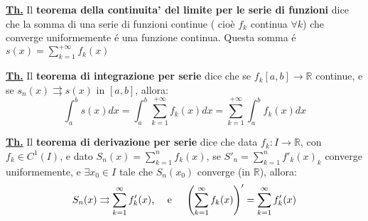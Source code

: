 \documentclass[a4paper,10pt]{article} %
\renewcommand{\b}[1]{%
    {\textbf{#1}}}
\newcommand{\lprop}[1]{%
    {\smallbreak\par\tiny\textbf{\underline{Prop.}} {#1} \smallbreak}}
\newcommand{\ltheorem}[1]{%
    {\smallbreak\par\tiny\textbf{\underline{Th.}} {#1} \smallbreak\par}}
\newcommand{\ldim}[1]{%
    {\smallbreak\par\tiny\emph{\textbf{Dimostrazione}} {#1} \par}}
\renewcommand{\ldim}[1]{{}}
\begin{document}
\begin{multicols}{6}

\ltheorem{
    Il \b{teorema della continuita' del limite per le serie di funzioni} dice che la somma di una serie di funzioni continue ( cio\`{e} $f_k$ continua $\forall k$) che converge uniformemente \'{e} una funzione continua. Questa somma \'{e} $ s(x) = \sum_{k=1}^{+\infty} f_k(x) $
}

\ltheorem{
    Il \b{teorema di integrazione per serie} dice che se
    $ f_k [a,b] \rightarrow \mathbb{R} $ continue, e se $ s_n(x) \rightrightarrows s(x) \text{ in } \left[a,b\right] $, allora:
    \[ \int_a^b s(x)dx = \int_a^b \sum_{k=1}^{+\infty} f_k(x) dx = \sum_{k=1}^{+\infty} \int_a^b f_k(x) dx \]
}

\ltheorem{
    Il \b{teorema di derivazione per serie} dice che data $f_k : I \rightarrow \mathbb{R}$, con
    $ f_k \in C^1(I)$, e dato $S_n(x) = \sum_{k=1}^n f_k(x)$, se $S'_n = \sum_{k=1}^n f'_k(x)_k$
    converge uniformemente, e $ \exists x_0 \in I $ tale che $ S_n(x_0) $ converge (in 
    $\mathbb{R}$), allora: 
    \[
    S_n(x) \rightrightarrows \sum_{k=1}^\infty f'_k(x)  \text{, \quad e \quad }
    \left( \sum_{k=1}^\infty f_k(x) \right)' = \sum_{k=1}^\infty f'_k(x)
    \]
}


\end{multicols}
\end{document}
